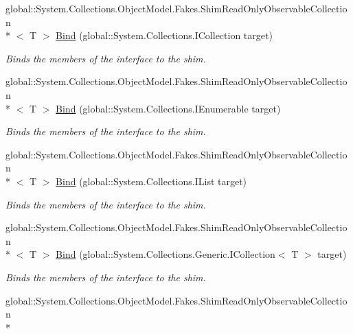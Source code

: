 \begin{DoxyCompactItemize}
global\-::\-System.\-Collections.\-Object\-Model.\-Fakes.\-Shim\-Read\-Only\-Observable\-Collection\\*
$<$ T $>$ \hyperlink{class_system_1_1_collections_1_1_object_model_1_1_fakes_1_1_shim_read_only_observable_collection_3_01_t_01_4_a2ba22c2b815cd333b962aedd93682fb8}{Bind} (global\-::\-System.\-Collections.\-I\-Collection target)
\begin{DoxyCompactList}\small\item\em Binds the members of the interface to the shim.\end{DoxyCompactList}\item 
global\-::\-System.\-Collections.\-Object\-Model.\-Fakes.\-Shim\-Read\-Only\-Observable\-Collection\\*
$<$ T $>$ \hyperlink{class_system_1_1_collections_1_1_object_model_1_1_fakes_1_1_shim_read_only_observable_collection_3_01_t_01_4_a539d3a18c951273a28c9b3a150a5376c}{Bind} (global\-::\-System.\-Collections.\-I\-Enumerable target)
\begin{DoxyCompactList}\small\item\em Binds the members of the interface to the shim.\end{DoxyCompactList}\item 
global\-::\-System.\-Collections.\-Object\-Model.\-Fakes.\-Shim\-Read\-Only\-Observable\-Collection\\*
$<$ T $>$ \hyperlink{class_system_1_1_collections_1_1_object_model_1_1_fakes_1_1_shim_read_only_observable_collection_3_01_t_01_4_a5ebeee5d565a5dd85e7b58fe21b38537}{Bind} (global\-::\-System.\-Collections.\-I\-List target)
\begin{DoxyCompactList}\small\item\em Binds the members of the interface to the shim.\end{DoxyCompactList}\item 
global\-::\-System.\-Collections.\-Object\-Model.\-Fakes.\-Shim\-Read\-Only\-Observable\-Collection\\*
$<$ T $>$ \hyperlink{class_system_1_1_collections_1_1_object_model_1_1_fakes_1_1_shim_read_only_observable_collection_3_01_t_01_4_abbfb2424efd7c21d4676595b27502ff2}{Bind} (global\-::\-System.\-Collections.\-Generic.\-I\-Collection$<$ T $>$ target)
\begin{DoxyCompactList}\small\item\em Binds the members of the interface to the shim.\end{DoxyCompactList}\item 
global\-::\-System.\-Collections.\-Object\-Model.\-Fakes.\-Shim\-Read\-Only\-Observable\-Collection\\*

\end{DoxyCompactItemize}
